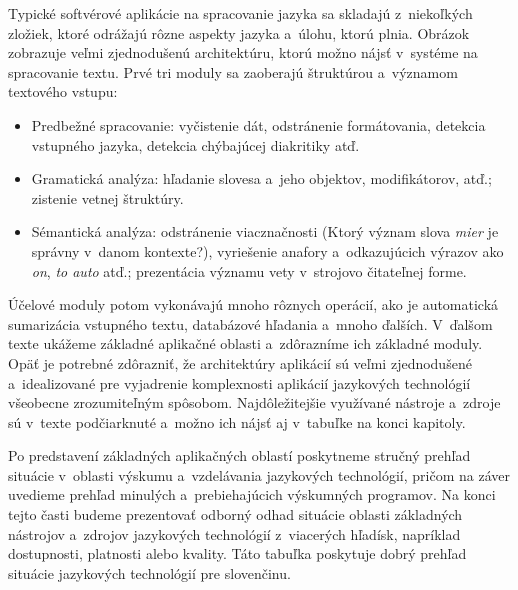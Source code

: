 Typické softvérové aplikácie na spracovanie jazyka sa skladajú z~niekoľkých zložiek, ktoré odrážajú rôzne aspekty jazyka a~úlohu, ktorú plnia. Obrázok zobrazuje veľmi zjednodušenú architektúru, ktorú možno nájsť v~systéme na spracovanie textu. Prvé tri moduly sa zaoberajú štruktúrou a~významom textového vstupu:

\begin{itemize}
\item Predbežné spracovanie: vyčistenie dát, odstránenie formátovania, detekcia vstupného jazyka, detekcia chýbajúcej diakritiky atď.
\item Gramatická analýza: hľadanie slovesa a~jeho objektov, modifikátorov, atď.; zistenie vetnej štruktúry.
\item Sémantická analýza: odstránenie viacznačnosti (Ktorý význam slova \emph{mier} je správny v~danom kontexte?), vyriešenie anafory a~odkazujúcich výrazov ako \emph{on}, \emph{to auto} atď.; prezentácia významu vety v~strojovo čitateľnej forme.
\end{itemize}

Účelové moduly potom vykonávajú mnoho rôznych operácií, ako je automatická sumarizácia vstupného textu, databázové hľadania a~mnoho ďalších. V~ďalšom texte ukážeme základné aplikačné oblasti a~zdôrazníme ich základné moduly. Opäť je potrebné zdôrazniť, že architektúry aplikácií sú veľmi zjednodušené a~idealizované pre vyjadrenie komplexnosti aplikácií jazykových technológií všeobecne zrozumiteľným spôsobom. Najdôležitejšie využívané nástroje a~zdroje sú v~texte podčiarknuté a~možno ich nájsť aj v~tabuľke na konci kapitoly.

Po predstavení základných aplikačných oblastí poskytneme stručný prehľad situácie v~oblasti výskumu a~vzdelávania jazykových technológií, pričom na záver uvedieme prehľad minulých a~prebiehajúcich výskumných programov. Na konci tejto časti budeme prezentovať odborný odhad situácie oblasti základných nástrojov a~zdrojov jazykových technológií z~viacerých hľadísk, napríklad dostupnosti, platnosti alebo kvality. Táto tabuľka poskytuje dobrý prehľad situácie jazykových technológií pre slovenčinu.
